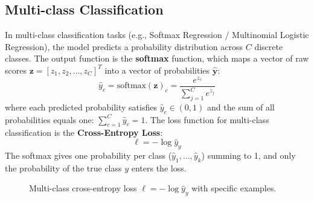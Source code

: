 \subsection{Multi-class Classification}
In multi-class classification tasks (e.g., Softmax Regression / Multinomial Logistic Regression), 
the model predicts a probability distribution across $C$ discrete classes. The output function is 
the \textbf{softmax} function, which maps a vector of raw scores 
$\mathbf{z} = [z_1, z_2, \dots, z_C]^T$ into a vector of probabilities $\hat{\mathbf{y}}$:
\begin{equation}
    \hat{y}_c = \text{softmax}(\mathbf{z})_c = \frac{e^{z_c}}{\sum_{j=1}^{C} e^{z_j}}
    \label{formula:softmax}
\end{equation}
where each predicted probability satisfies $\hat{y}_c \in (0, 1)$ and the sum of all probabilities 
equals one: $\sum_{c=1}^{C} \hat{y}_c = 1$. 
\newline
The loss function for multi-class classification is the \textbf{Cross-Entropy Loss}:
\begin{equation}
    \ell = - \log \hat{y}_y
\end{equation}
The softmax gives one probability per class ($\hat{y}_1, \dots, \hat{y}_k$) summing to 
1, and only the probability of the true class $y$ enters the loss.

\begin{figure}[H]
    \centering
    \caption{Multi-class cross-entropy loss $\ell = -\log \hat{y}_y$ with specific examples.}
    \label{fig:multiclass_loss}
\end{figure}

